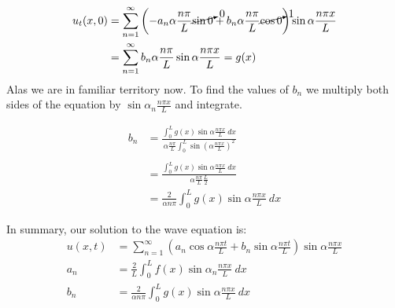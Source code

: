 \begin{align*}
u_t(x,0) &= \sum\limits_{n=1}^{\infty}\left(-a_n\alpha \frac{n \pi}{L} \cancelto{0}{\sin{0}} + b_n\alpha \frac{n \pi}{L} \cancelto{1}{\cos{0}} \right) \sin{\alpha \frac{n \pi x}{L}} \\
&=\sum\limits_{n=1}^{\infty} b_n \alpha \frac{n \pi}{L} \sin{\alpha \frac{n \pi x}{L}} = g(x)
\end{align*}
Alas we are in familiar territory now.  To find the values of $b_n$ we multiply both sides of the equation by $\sin{\alpha_n \frac{n \pi x}{L}}$ and integrate.

\begin{align*}
b_n &= \frac{\int_{0}^{L} g(x) \sin{\alpha \frac{n \pi x}{L}} \ dx }{\alpha \frac{n \pi}{L}\int_{0}^{L} \sin{\left(\alpha \frac{n \pi x}{L} \right)}^2} \\
& \\
&= \frac{\int_{0}^{L} g(x) \sin{\alpha \frac{n \pi x}{L}} \ dx }{\alpha \frac{n \pi}{L}\frac{L}{2}} \\
&= \frac{2}{\alpha n \pi} \int_{0}^{L} g(x) \sin{\alpha \frac{n \pi x}{L}} \ dx
\end{align*}  

\vspace{0.25cm}
\noindent In summary, our solution to the wave equation is:
\begin{align*}
u(x,t) &= \sum\limits_{n=1}^{\infty} \left(a_n \cos{\alpha \frac{n \pi t}{L}} + b_n \sin{\alpha \frac{n \pi t}{L}} \right) \sin{\alpha \frac{n \pi x}{L}} \\
a_n &= \frac{2}{L} \int_{0}^{L} f(x) \sin{\alpha_n \frac{n \pi x}{L}} \ dx \\
b_n &= \frac{2}{\alpha n \pi} \int_{0}^{L} g(x) \sin{\alpha \frac{n \pi x}{L}} \ dx
\end{align*}

\vspace{4.0cm}

